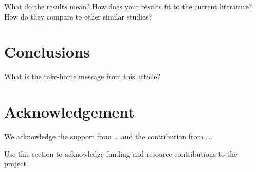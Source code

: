 What do the results mean? How does your results fit to the current
literature? How do they compare to other similar studies?

\section*{Conclusions}\label{conclusions}

What is the take-home message from this article?

\section{Acknowledgement}\label{acknowledgement}

We acknowledge the support from \ldots{} and the contribution from
\ldots{}.

Use this section to acknowledge funding and resource contributions to
the project.
